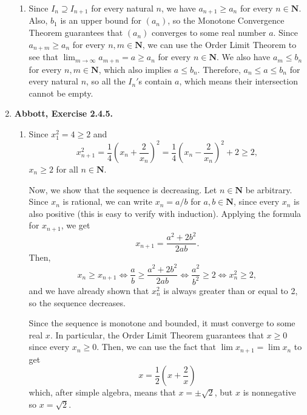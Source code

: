 \documentclass{article}
\newcommand{\N}{\mathbf{N}}
\newcommand{\exc}[2][Abbott]{\item \textbf{#1, Exercise #2.}}
\begin{document}
\begin{enumerate}
\begin{enumerate}
        \item Since $I_{n} \supseteq I_{n+1}$ for every natural $n$, we have $a_{n+1} \geq a_n$ for every $n \in \N$. Also, $b_1$ is an upper bound for $(a_n)$, so the Monotone Convergence Theorem guarantees that $(a_n)$ converges to some real number $a$. Since $a_{n+m} \geq a_n$ for every $n,m \in \N$, we can use the Order Limit Theorem to see that $\lim_{m \to \infty} a_{m+n} = a \geq a_n$ for every $n \in \N$. We also have $a_m \leq b_n$ for every $n, m \in \N$, which also implies $a \leq b_n$. Therefore, $a_n \leq a \leq b_n$ for every natural $n$, so all the $I_n'$s contain $a$, which means their intersection cannot be empty.
    \end{enumerate}
    
    \exc{2.4.5}
    \begin{enumerate}
        \item Since $x_1^2 = 4 \geq 2$ and
        \begin{equation*}
            x_{n+1}^2 = \frac{1}{4}\left(x_n+\frac{2}{x_n}\right)^2 = 
            \frac{1}{4}\left(x_n-\frac{2}{x_n}\right)^2 + 2 \geq 2,
        \end{equation*} $x_n \geq 2$ for all $n \in \N$.
        
        Now, we show that the sequence is decreasing. Let $n \in \N$ be arbitrary. Since $x_n$ is rational, we can write $x_n = a/b$ for $a,b \in \N$, since every $x_n$ is also positive (this is easy to verify with induction). Applying the formula for $x_{n+1}$, we get 
        \begin{equation*}
            x_{n+1} = \frac{a^2+2b^2}{2ab}.
        \end{equation*}
        Then, 
        \begin{equation*}
            x_n \geq x_{n+1} \iff \frac{a}{b} \geq \frac{a^2+2b^2}{2ab} \iff
            \frac{a^2}{b^2} \geq 2 \iff x_n^2 \geq 2,
        \end{equation*} and we have already shown that $x_n^2$ is always greater than or equal to 2, so the sequence decreases.
        
        Since the sequence is monotone and bounded, it must converge to some real $x$. In particular, the Order Limit Theorem guarantees that $x \geq 0$ since every $x_n \geq 0$.
        Then, we can use the fact that $\lim x_{n+1} = \lim x_n$ to get 
        \begin{equation*}
            x = \frac{1}{2} \left(x + \frac{2}{x}\right)
        \end{equation*} which, after simple algebra, means that $x = \pm \sqrt{2}$, but $x$ is nonnegative so $x = \sqrt{2}$.
        

\end{enumerate}
\end{enumerate}
\end{document}
